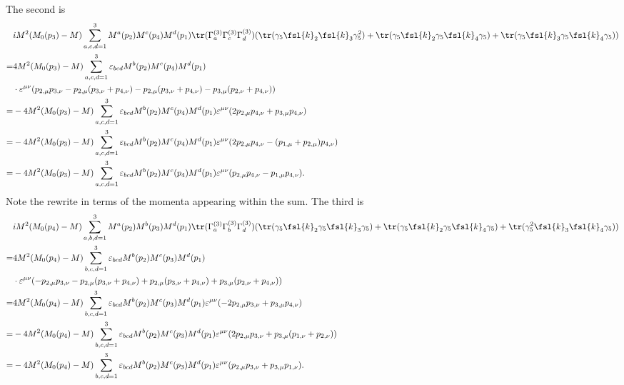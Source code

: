 The second is
\begin{align*}
	 &iM^{2}(M_{0}(p_{3}) - M)\sum\limits_{a, c, d = 1}^{3}M^{a}(p_{2})M^{c}(p_{4})M^{d}(p_{1})\tr(\Gamma_{a}^{(3)}\Gamma_{c}^{(3)}\Gamma_{d}^{(3)})(\tr(\gamma_{5}\fsl{k}_{2}\fsl{k}_{3}\gamma_{5}^{2}) + \tr(\gamma_{5}\fsl{k}_{2}\gamma_{5}\fsl{k}_{4}\gamma_{5}) + \tr(\gamma_{5}\fsl{k}_{3}\gamma_{5}\fsl{k}_{4}\gamma_{5})) \\
	=& 4M^{2}(M_{0}(p_{3}) - M)\sum\limits_{a, c, d = 1}^{3}\varepsilon_{bcd}M^{b}(p_{2})M^{c}(p_{4})M^{d}(p_{1}) \\
	 &\cdot\varepsilon^{\mu\nu}(p_{2, \mu}p_{3, \nu} - p_{2, \mu}(p_{3, \nu} + p_{4, \nu}) - p_{2, \mu}(p_{3, \nu} + p_{4, \nu}) - p_{3, \mu}(p_{2, \nu} + p_{4, \nu})) \\
	=& -4M^{2}(M_{0}(p_{3}) - M)\sum\limits_{a, c, d = 1}^{3}\varepsilon_{bcd}M^{b}(p_{2})M^{c}(p_{4})M^{d}(p_{1})\varepsilon^{\mu\nu}(2p_{2, \mu}p_{4, \nu} + p_{3, \mu}p_{4, \nu}) \\
	=& -4M^{2}(M_{0}(p_{3}) - M)\sum\limits_{a, c, d = 1}^{3}\varepsilon_{bcd}M^{b}(p_{2})M^{c}(p_{4})M^{d}(p_{1})\varepsilon^{\mu\nu}(2p_{2, \mu}p_{4, \nu} - (p_{1, \mu} + p_{2, \mu})p_{4, \nu}) \\
	=& -4M^{2}(M_{0}(p_{3}) - M)\sum\limits_{a, c, d = 1}^{3}\varepsilon_{bcd}M^{b}(p_{2})M^{c}(p_{4})M^{d}(p_{1})\varepsilon^{\mu\nu}(p_{2, \mu}p_{4, \nu} - p_{1, \mu}p_{4, \nu}).
\end{align*}
Note the rewrite in terms of the momenta appearing within the sum. The third is
\begin{align*}
	 &iM^{2}(M_{0}(p_{4}) - M)\sum\limits_{a, b, d = 1}^{3}M^{a}(p_{2})M^{b}(p_{3})M^{d}(p_{1})\tr(\Gamma_{a}^{(3)}\Gamma_{b}^{(3)}\Gamma_{d}^{(3)})(\tr(\gamma_{5}\fsl{k}_{2}\gamma_{5}\fsl{k}_{3}\gamma_{5}) + \tr(\gamma_{5}\fsl{k}_{2}\gamma_{5}\fsl{k}_{4}\gamma_{5}) + \tr(\gamma_{5}^{2}\fsl{k}_{3}\fsl{k}_{4}\gamma_{5})) \\
	=& 4M^{2}(M_{0}(p_{4}) - M)\sum\limits_{b, c, d = 1}^{3}\varepsilon_{bcd}M^{b}(p_{2})M^{c}(p_{3})M^{d}(p_{1}) \\
	 &\cdot\varepsilon^{\mu\nu}(-p_{2, \mu}p_{3, \nu} - p_{2, \mu}(p_{3, \nu} + p_{4, \nu}) + p_{2, \mu}(p_{3, \nu} + p_{4, \nu}) + p_{3, \mu}(p_{2, \nu} + p_{4, \nu})) \\
	=& 4M^{2}(M_{0}(p_{4}) - M)\sum\limits_{b, c, d = 1}^{3}\varepsilon_{bcd}M^{b}(p_{2})M^{c}(p_{3})M^{d}(p_{1})\varepsilon^{\mu\nu}(-2p_{2, \mu}p_{3, \nu} + p_{3, \mu}p_{4, \nu}) \\
	=& -4M^{2}(M_{0}(p_{4}) - M)\sum\limits_{b, c, d = 1}^{3}\varepsilon_{bcd}M^{b}(p_{2})M^{c}(p_{3})M^{d}(p_{1})\varepsilon^{\mu\nu}(2p_{2, \mu}p_{3, \nu} + p_{3, \mu}(p_{1, \nu} + p_{2, \nu})) \\
	=& -4M^{2}(M_{0}(p_{4}) - M)\sum\limits_{b, c, d = 1}^{3}\varepsilon_{bcd}M^{b}(p_{2})M^{c}(p_{3})M^{d}(p_{1})\varepsilon^{\mu\nu}(p_{2, \mu}p_{3, \nu} + p_{3, \mu}p_{1, \nu}).
\end{align*}
